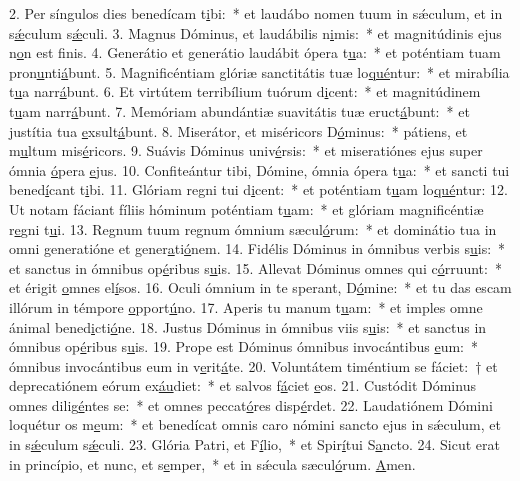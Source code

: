 2. Per síngulos dies benedícam t\uline{i}bi:~* et laudábo nomen tuum in sǽculum, et in s\uline{ǽ}culum s\uline{ǽ}culi.
3. Magnus Dóminus, et laudábilis n\uline{i}mis:~* et magnitúdinis ejus n\uline{o}n est f\uline{i}nis.
4. Generátio et generátio laudábit ópera t\uline{u}a:~* et poténtiam tuam pron\uline{u}nti\uline{á}bunt.
5. Magnificéntiam glóriæ sanctitátis tuæ lo\uline{qué}ntur:~* et mirabília t\uline{u}a narr\uline{á}bunt.
6. Et virtútem terribílium tuórum d\uline{i}cent:~* et magnitúdinem t\uline{u}am narr\uline{á}bunt.
7. Memóriam abundántiæ suavitátis tuæ eruct\uline{á}bunt:~* et justítia tua \uline{e}xsult\uline{á}bunt.
8. Miserátor, et miséricors D\uline{ó}minus:~* pátiens, et m\uline{u}ltum mis\uline{é}ricors.
9. Suávis Dóminus univ\uline{é}rsis:~* et miseratiónes ejus super ómnia \uline{ó}pera \uline{e}jus.
10. Confiteántur tibi, Dómine, ómnia ópera t\uline{u}a:~* et sancti tui bened\uline{í}cant t\uline{i}bi.
11. Glóriam regni tui d\uline{i}cent:~* et poténtiam t\uline{u}am lo\uline{qué}ntur:
12. Ut notam fáciant fíliis hóminum poténtiam t\uline{u}am:~* et glóriam magnificéntiæ r\uline{e}gni t\uline{u}i.
13. Regnum tuum regnum ómnium sæcul\uline{ó}rum:~* et dominátio tua in omni generatióne et gener\uline{a}ti\uline{ó}nem.
14. Fidélis Dóminus in ómnibus verbis s\uline{u}is:~* et sanctus in ómnibus op\uline{é}ribus s\uline{u}is.
15. Allevat Dóminus omnes qui c\uline{ó}rruunt:~* et érigit \uline{o}mnes el\uline{í}sos.
16. Oculi ómnium in te sperant, D\uline{ó}mine:~* et tu das escam illórum in témpore \uline{o}pport\uline{ú}no.
17. Aperis tu manum t\uline{u}am:~* et imples omne ánimal bened\uline{i}cti\uline{ó}ne.
18. Justus Dóminus in ómnibus viis s\uline{u}is:~* et sanctus in ómnibus op\uline{é}ribus s\uline{u}is.
19. Prope est Dóminus ómnibus invocántibus \uline{e}um:~* ómnibus invocántibus eum in v\uline{e}rit\uline{á}te.
20. Voluntátem timéntium se fáciet:~† et deprecatiónem eórum ex\uline{áu}diet:~* et salvos f\uline{á}ciet \uline{e}os.
21. Custódit Dóminus omnes dilig\uline{é}ntes se:~* et omnes peccat\uline{ó}res disp\uline{é}rdet.
22. Laudatiónem Dómini loquétur os m\uline{e}um:~* et benedícat omnis caro nómini sancto ejus in sǽculum, et in s\uline{ǽ}culum s\uline{ǽ}culi.
23. Glória Patri, et F\uline{í}lio,~* et Spir\uline{í}tui S\uline{a}ncto.
24. Sicut erat in princípio, et nunc, et s\uline{e}mper,~* et in sǽcula sæcul\uline{ó}rum. \uline{A}men.
